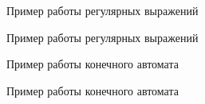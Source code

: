 \documentclass[a4paper,12pt]{article}
\begin{document}
\begin{figure}[h!]
	\caption{
		Пример работы регулярных выражений}
	\label{fig:t1}
\end{figure}

\begin{figure}[h!]
	\caption{
		Пример работы регулярных выражений}
	\label{fig:t2}
\end{figure}

\newpage

\begin{figure}[h!]
	\caption{
		Пример работы конечного автомата}
	\label{fig:t3}
\end{figure}

\begin{figure}[h!]
	\caption{
		Пример работы конечного автомата}
	\label{fig:t4}
\end{figure}
\end{document}
